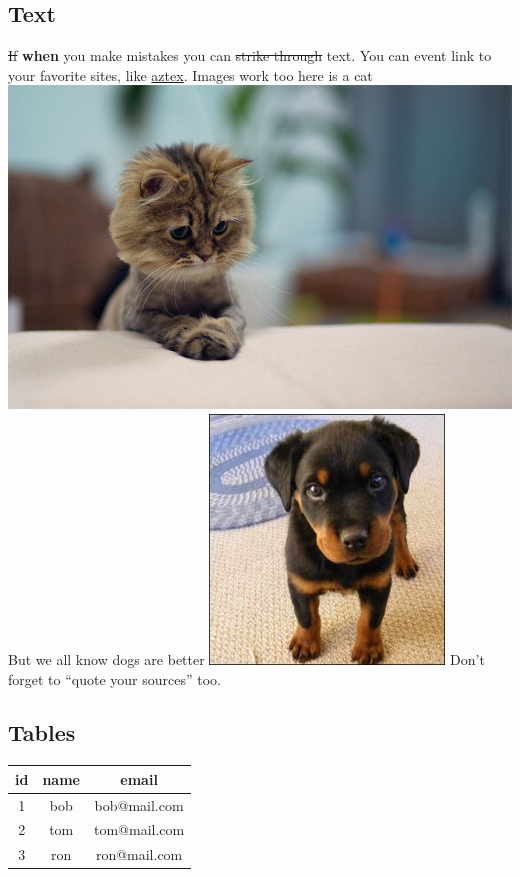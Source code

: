 \documentclass{article}
\begin{document}
\subsection{Text}
\sout{If} \textbf{when} you make mistakes you can \sout{strike through} text.
You can event link to your favorite sites, like \href{http://github.com/thuc289/azTex}{aztex}.
Images work too here is a cat \includegraphics{cat.jpg}
But we all know dogs are better
\includegraphics{dog}
Don't forget to ``quote your sources'' too.
\subsection{Tables}
\noindent
\begin{tabular}{| c | c | c |}
\hline 
id
&name
&email
\\
\hline 
1
&bob
&bob@mail.com
\\
\hline 
2
&tom
&tom@mail.com
\\
\hline 
3
&ron
&ron@mail.com
\\
\hline 
\end{tabular}
\end{document}

